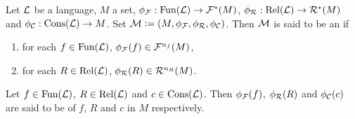 \documentclass{book}
\begin{document}

	\begin{defn}
		Let $\mathcal{L}$ be a language, $M$ a set, $\phi_{\mathcal{F}}: \operatorname*{\text{Fun}}(\mathcal{L}) \rightarrow \mathcal{F}^*(M)$, $\phi_{\mathcal{R}}: \operatorname*{\text{Rel}}(\mathcal{L}) \rightarrow \mathcal{R}^*(M)$ and $\phi_{\mathcal{C}}: \operatorname*{\text{Cons}}(\mathcal{L}) \rightarrow M$. Set $\mathcal{M} \vcentcolon= (M, \phi_{\mathcal{F}}, \phi_{\mathcal{R}}, \phi_{\mathcal{C}})$. Then $\mathcal{M}$ is said to be an  if 
		\begin{enumerate}
			\item for each $f \in \operatorname*{\text{Fun}}(\mathcal{L})$, $\phi_{\mathcal{F}}(f) \in \mathcal{F}^{n_f}(M)$,
			\item for each $R \in \operatorname*{\text{Rel}}(\mathcal{L})$, $\phi_{\mathcal{R}}(R) \in \mathcal{R}^{n_R}(M)$.
		\end{enumerate}
		Let $f \in \operatorname*{\text{Fun}}(\mathcal{L})$, $R \in \operatorname*{\text{Rel}}(\mathcal{L})$ and $c \in \operatorname*{\text{Cons}}(\mathcal{L})$. Then $\phi_{\mathcal{F}}(f)$, $\phi_{\mathcal{R}}(R)$ and $\phi_{\mathcal{C}}(c)$ are said to be  of $f$, $R$ and $c$ in $M$ respectively.
	\end{defn}
	
	
	
	
	
	
	
	
	
	
	
	
	
	
	
	
	
	
	
	
	
	
	
	
	
	
	
	
	
	
	
	
	
	
	
	
	
	
	
	
	
	
	
	
	
	
	
	
	
	
	
	
	
	
	
	
	
	
	
	
\end{document}
